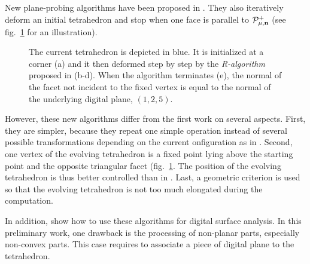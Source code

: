 New plane-probing algorithms have been proposed in \cite{LPRDGCI2016, LPRJMIV2017}. 
They also iteratively deform an initial tetrahedron and stop when one face is
parallel to $\mathcal{P}^{+}_{\mu,\mathbf{n}}$ (see fig.~\ref{fig:ppa} for an illustration). 
%
\begin{figure}[htbp]
  \centering
  \caption{The current tetrahedron is depicted in blue. It is initialized at a corner (a) 
    and it then deformed step by step by the \emph{R-algorithm} proposed in \cite{LPRJMIV2017} (b-d).
    When the algorithm terminates (e), the normal of the facet not incident to the fixed vertex
    is equal to the normal of the underlying digital plane, \ie $(1,2,5)$.}
    \label{fig:ppa}
\end{figure}
%
However, these new algorithms differ from the first work on several aspects.
First, they are simpler, because they repeat one simple operation instead
of several possible transformations depending on the current onfiguration
as in \cite{LPRTCS2016}.  
Second, one vertex of the evolving tetrahedron is a fixed point lying above the 
starting point and the opposite triangular facet (fig.~\ref{fig:ppa}. The position
of the evolving tetrahedron is thus better controlled than in \cite{LPRTCS2016}. 
Last, a geometric criterion is used so that the evolving tetrahedron is not
too much elongated during the computation.  

In addition, \cite{LPRJMIV2017} show how to use these algorithms
for digital surface analysis. In this preliminary work, one drawback is
the processing of non-planar parts, especially non-convex parts. This case
requires to associate a piece of digital plane to the tetrahedron.




